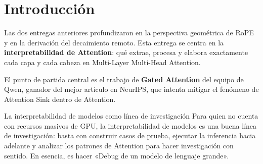 \section{Introducción}

Las dos entregas anteriores profundizaron en la perspectiva geométrica de RoPE y en la derivación del decaimiento remoto. Esta entrega se centra en la \textbf{interpretabilidad de Attention}: qué extrae, procesa y elabora exactamente cada capa y cada cabeza en Multi-Layer Multi-Head Attention.

El punto de partida central es el trabajo de \textbf{Gated Attention} del equipo de Qwen, ganador del mejor artículo en NeurIPS, que intenta mitigar el fenómeno de Attention Sink dentro de Attention.

\begin{knowledgebox}{La interpretabilidad de modelos como línea de investigación}
Para quien no cuenta con recursos masivos de GPU, la interpretabilidad de modelos es una buena línea de investigación: basta con construir casos de prueba, ejecutar la inferencia hacia adelante y analizar los patrones de Attention para hacer investigación con sentido. En esencia, es hacer «Debug de un modelo de lenguaje grande».
\end{knowledgebox}

